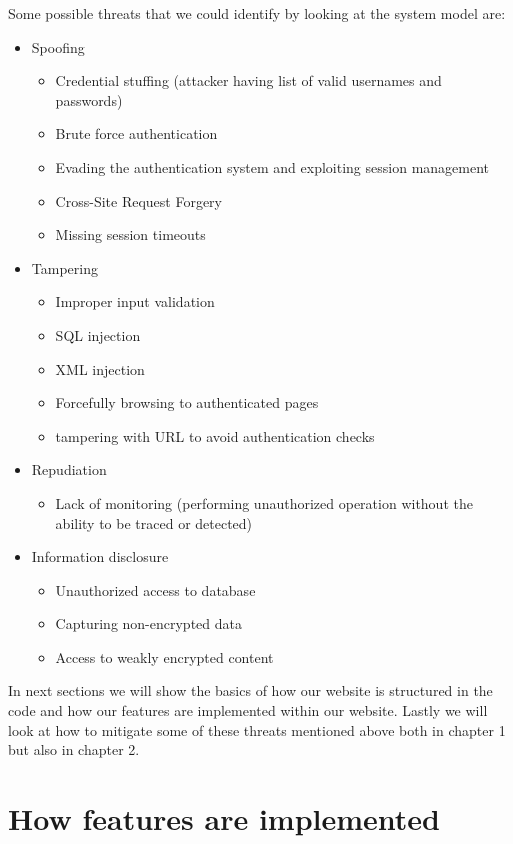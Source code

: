 Some possible threats that we could identify by looking at the system model are:
\begin{itemize}
   \item Spoofing
   \begin{itemize}
      \item Credential stuffing (attacker having list of valid usernames and passwords)
      \item Brute force authentication
      \item Evading the authentication system and exploiting session management
      \item Cross-Site Request Forgery
      \item Missing session timeouts 
  \end{itemize}
  \item Tampering
  \begin{itemize}
     \item Improper input validation
     \item SQL injection
     \item XML injection
     \item Forcefully browsing to authenticated pages 
     \item tampering with URL to avoid authentication checks
   \end{itemize}
   \item Repudiation
   \begin{itemize}
    \item  Lack of monitoring (performing unauthorized operation without the ability to be traced or detected)
   \end{itemize}
   \item Information disclosure
   \begin{itemize}
     \item Unauthorized access to database
     \item Capturing non-encrypted data
     \item Access to weakly encrypted content
   \end{itemize}
\end{itemize}

In next sections we will show the basics of how our website is structured in the code and how our features are implemented within our website. Lastly we will look at how to mitigate some of these threats mentioned above both in chapter 1 but also in chapter 2. %

\section{How features are implemented}

